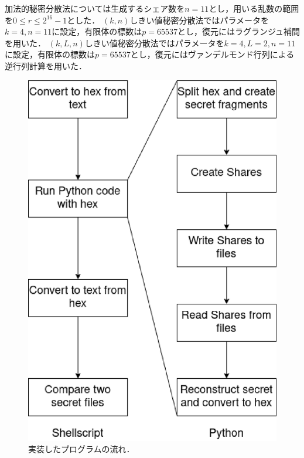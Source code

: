 \documentclass[twocolumn]{jarticle}
\begin{document}
加法的秘密分散法については生成するシェア数を$n=11$とし，用いる乱数の範囲を$0{\leq}r{\leq}2^{16}-1$とした．
%
$(k,n)$しきい値秘密分散法ではパラメータを$k=4,n=11$に設定，有限体の標数は$p=65537$とし，復元にはラグランジュ補間を用いた．
%
$(k,L,n)$しきい値秘密分散法ではパラメータを$k=4,L=2,n=11$に設定，有限体の標数は$p=65537$とし，復元にはヴァンデルモンド行列による逆行列計算を用いた．
%
\begin{figure}[t]
	\begin{center}
		\includegraphics[scale=0.4]{program.eps}
		\caption{実装したプログラムの流れ．}
		\label{fig:program}
	\end{center}
	\vspace{-4mm}
\end{figure}


\vspace{-6mm}
\end{document}
